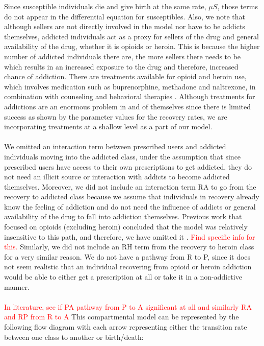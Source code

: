 \documentclass[12pt]{article}
\begin{document}
Since susceptible individuals die and give birth at the same rate, $\mu S$, those terms do not appear in the differential equation for susceptibles. Also, we note that although sellers are not directly involved in the model nor have to be addicts themselves, addicted individuals act as a proxy for sellers of the drug and general availability of the drug, whether it is opioids or heroin. This is because the higher number of addicted individuals there are, the more sellers there needs to be which results in an increased exposure to the drug and therefore, increased chance of addiction. There are treatments available for opioid and heroin use, which involves medication such as buprenorphine, methadone and naltrexone, in combination with counseling and behavioral therapies \cite{SAMSHA1}. Although treatments for addictions are an enormous problem in and of themselves since there is limited success as shown by the parameter values for the recovery rates, we are incorporating treatments at a shallow level as a part of our model.   \\ \\
We omitted an interaction term between prescribed users and addicted individuals moving into the addicted class, under the assumption that since prescribed users have access to their own prescriptions to get addicted, they do not need an illicit source or interaction with addicts to become addicted themselves. Moreover, we did not include an interaction term RA to go from the recovery to addicted class because we assume that individuals in recovery already know the feeling of addiction and do not need the influence of addicts or general availability of the drug to fall into addiction themselves. Previous work that focused on opioids (excluding heroin) concluded that the model was relatively insensitive to this path, and therefore, we have omitted it \cite{Battista}. \textcolor{red}{Find specific info for this.} Similarly, we did not include an RH term from the recovery to heroin class for a very similar reason. We do not have a pathway from R to P, since it does not seem realistic that an individual recovering from opioid or heroin addiction would be able to either get a prescription at all or take it in a non-addictive manner.\\ \\
\textcolor{red}{In literature, see if PA pathway from P to A significant at all and similarly RA and RP from R to A} 
This compartmental model can be represented by the following flow diagram with each arrow representing either the transition rate between one class to another or birth/death: 
\end{document}
